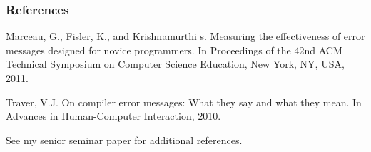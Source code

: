 \documentclass{beamer}
\newcommand{\linespace}{\vskip 0.25cm}
\begin{document}
\begin{frame} 
	\frametitle{References} 
	
	\begin{thebibliography}{lskdjf}
	
Marceau, G., Fisler, K., and Krishnamurthi s.
\newblock Measuring the effectiveness of error messages designed for novice programmers.
\newblock In Proceedings of the 42nd ACM Technical Symposium on Computer Science Education, New York, NY, USA, 2011.
	
	Traver, V.J.
\newblock On compiler error messages: What they say and what they mean.
\newblock In Advances in Human-Computer Interaction, 2010.
  
  	\end{thebibliography}
	
	\linespace
	\begin{center}
	See my senior seminar paper for additional references.
	\end{center}
\end{frame} 
\end{document}
